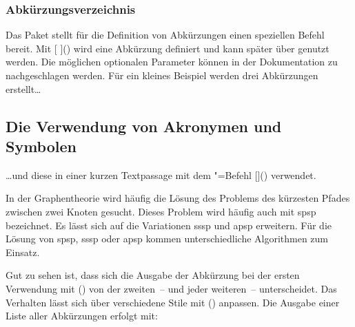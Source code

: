 \documentclass[%
  english,ngerman,%
  cdgeometry=no,DIV=12,%
  cd=false,cdfont=false,cdtitle=true,%
  headings=normal,%
  automark,%
  listof=toc,%
]{tudscrartcl}
\begin{document}
\subsubsection{Abkürzungsverzeichnis}
Das Paket  stellt für die Definition von Abkürzungen einen 
speziellen Befehl bereit. Mit [%
  \LParameter{}%
]() wird eine Abkürzung definiert und kann später über 
 genutzt werden. Die möglichen optionalen Parameter können in 
der Dokumentation zu  nachgeschlagen werden. Für ein 
kleines Beispiel werden drei Abkürzungen erstellt\dots
%
\begin{Trunk+}
\section{Die Verwendung von Akronymen und Symbolen}
\end{Trunk+}
\CodeHook{\renewcommand*\newglossaryentry[2]{}}
\begin{Trunk*}

\end{Trunk*}
%
\dots und diese in einer kurzen Textpassage mit dem "=Befehl
[]() verwendet.
%
\begin{Trunk*}
In der Graphentheorie wird häufig die Lösung des Problems des kürzesten
Pfades zwischen zwei Knoten gesucht. Dieses Problem wird häufig auch
mit \gls{spsp} bezeichnet. Es lässt sich auf die Variationen \gls{sssp}
und \gls{apsp} erweitern. Für die Lösung von \gls{spsp}, \gls{sssp} 
oder \gls{apsp} kommen unterschiedliche Algorithmen zum Einsatz.

\end{Trunk*}
%
Gut zu sehen ist, dass sich die Ausgabe der Abkürzung bei der ersten Verwendung 
mit () von der zweiten~-- und jeder weiteren~-- 
unterscheidet. Das Verhalten lässt sich über verschiedene Stile mit 
() anpassen. Die Ausgabe einer Liste 
aller Abkürzungen erfolgt mit:
%
\begin{Hint}
\printacronyms
\end{Hint}
\end{document}
